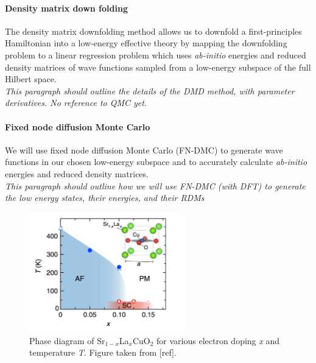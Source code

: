 \documentclass{article}
\begin{document}
\paragraph{Density matrix down folding} 
The density matrix downfolding method allows us to downfold a first-principles Hamiltonian into a low-energy effective theory by mapping the downfolding problem to a linear regression problem which uses \textit{ab-initio} energies and reduced density matrices of wave functions sampled from a low-energy subspace of the full Hilbert space.
\\
\textit{This paragraph should outline the details of the DMD method, with parameter derivatives. No reference to QMC yet.}

\paragraph{Fixed node diffusion Monte Carlo}
We will use fixed node diffusion Monte Carlo (FN-DMC) to generate wave functions in our chosen low-energy subspace and to accurately calculate \textit{ab-initio} energies and reduced density matrices.
\\
\textit{This paragraph should outline how we will use FN-DMC (with DFT) to generate the low energy states, their energies, and their RDMs}

\begin{figure}[H]
\centering
\includegraphics[width=0.6\textwidth]{Figures/I1-phase_diagram.pdf}
\caption{\label{fig1} Phase diagram of Sr$_{1-x}$La$_x$CuO$_2$ for various electron doping \textit{x} and temperature \textit{T}. Figure taken from [ref].}
\end{figure}
\end{document}
